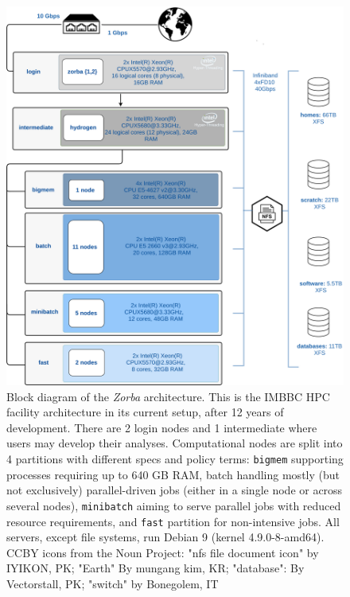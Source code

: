    \begin{figure}
      \centering
      \includegraphics[width=\columnwidth]{figures/zorba_architecture.png}
      \caption{
         Block diagram of the \textit{Zorba} architecture. 
         This is the IMBBC HPC facility architecture in its current setup, after 12 years of development. 
         There are 2 login nodes and 1 intermediate where users may develop their analyses. 
         Computational nodes are split into 4 partitions with different specs and policy terms: 
         \texttt{bigmem} supporting processes requiring up to 640 GB RAM, batch handling mostly 
         (but not exclusively) parallel-driven jobs (either in a single node or across several nodes), 
         \texttt{minibatch} aiming to serve parallel jobs with reduced resource requirements, and \texttt{fast} partition for non-intensive jobs. 
         All servers, except file systems, run Debian 9 (kernel 4.9.0-8-amd64). 
         CCBY icons from the Noun Project: "nfs file document icon" by IYIKON, PK; "Earth" 
         By mungang kim, KR; "database": By Vectorstall, PK; "switch" by Bonegolem, IT
      }

   \end{figure}





